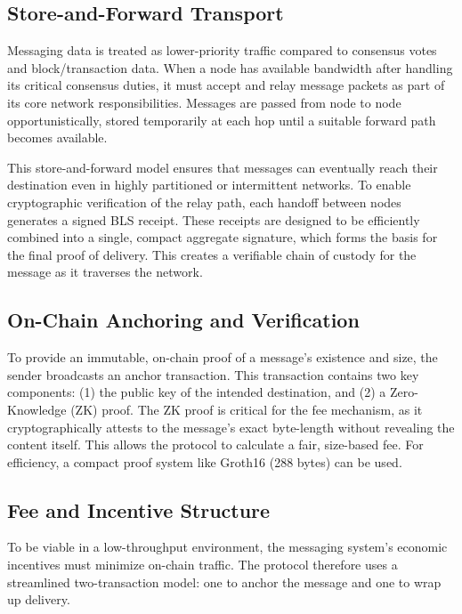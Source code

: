 \documentclass{article}
\begin{document}
\subsection{Store-and-Forward Transport}

Messaging data is treated as lower-priority traffic compared to consensus votes and block/transaction data. When a node has available bandwidth after handling its critical consensus duties, it must accept and relay message packets as part of its core network responsibilities. Messages are passed from node to node opportunistically, stored temporarily at each hop until a suitable forward path becomes available.

This store-and-forward model ensures that messages can eventually reach their destination even in highly partitioned or intermittent networks. To enable cryptographic verification of the relay path, each handoff between nodes generates a signed BLS receipt. These receipts are designed to be efficiently combined into a single, compact aggregate signature, which forms the basis for the final proof of delivery. This creates a verifiable chain of custody for the message as it traverses the network.

\subsection{On-Chain Anchoring and Verification}

To provide an immutable, on-chain proof of a message's existence and size, the sender broadcasts an anchor transaction. This transaction contains two key components: (1) the public key of the intended destination, and (2) a Zero-Knowledge (ZK) proof. The ZK proof is critical for the fee mechanism, as it cryptographically attests to the message's exact byte-length without revealing the content itself. This allows the protocol to calculate a fair, size-based fee. For efficiency, a compact proof system like Groth16 (288 bytes) can be used.

\subsection{Fee and Incentive Structure}

To be viable in a low-throughput environment, the messaging system's economic incentives must minimize on-chain traffic. The protocol therefore uses a streamlined two-transaction model: one to anchor the message and one to wrap up delivery.
\end{document}

